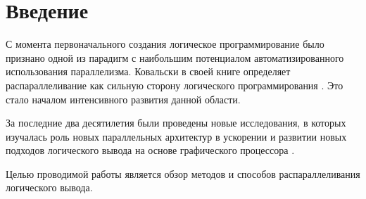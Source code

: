 \chapter*{Введение}

С момента первоначального создания логическое программирование было признано одной из парадигм с наибольшим потенциалом автоматизированного использования параллелизма. Ковальски в своей книге определяет распараллеливание как сильную сторону логического программирования \cite{kowalski}. Это стало началом интенсивного развития данной области.

За последние два десятилетия были проведены новые исследования, в которых изучалась роль новых параллельных архитектур в ускорении и развитии новых подходов логического вывода на основе графического процессора \cite{logic_researchers2}. 

Целью проводимой работы является обзор методов и способов распараллеливания логического вывода.